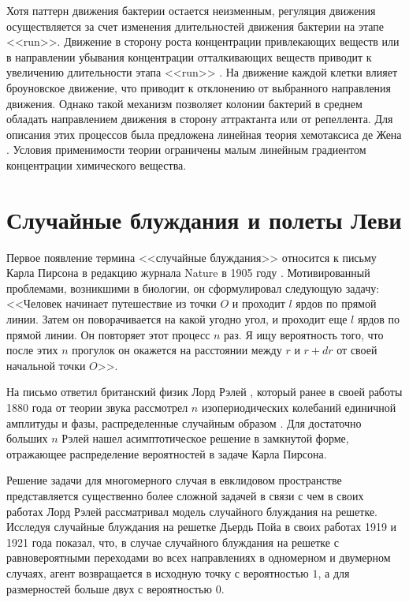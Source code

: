 Хотя паттерн движения бактерии остается неизменным, регуляция движения осуществляется за счет изменения длительностей движения бактерии на этапе <<run>>. Движение в сторону роста концентрации привлекающих веществ или в направлении убывания концентрации отталкивающих веществ приводит к увеличению длительности этапа <<run>> \cite{berg_chemotaxis_1972}. На движение каждой клетки влияет броуновское движение, что приводит к отклонению от выбранного направления движения. Однако такой механизм позволяет колонии бактерий в среднем обладать направлением движения в сторону аттрактанта или от репеллента. Для описания этих процессов была предложена линейная теория хемотаксиса де Жена \cite{de_gennes_chemotaxis_2004}. Условия применимости теории ограничены малым линейным градиентом концентрации химического вещества.

\section{Случайные блуждания и полеты Леви}\label{sec:ch1/sec2}

Первое появление термина <<случайные блуждания>> относится к письму Карла Пирсона в редакцию журнала Nature в 1905 году \cite{pearson_problem_1905}. Мотивированный проблемами, возникшими в биологии, он сформулировал следующую задачу: <<Человек начинает путешествие из точки $O$ и проходит $l$ ярдов по прямой линии. Затем он поворачивается на какой угодно угол, и проходит еще $l$ ярдов по прямой линии. Он повторяет этот процесс $n$ раз. Я ищу вероятность того, что после этих $n$ прогулок он окажется на расстоянии между $r$ и $r+dr$ от своей начальной точки $O$>>.

На письмо ответил британский физик Лорд Рэлей \cite{rayleigh_problem_1905}, который ранее в своей работы 1880 года от теории звука рассмотрел $n$ изопериодических колебаний единичной амплитуды и фазы, распределенные случайным образом \cite{rayleigh_lxi_1877}. Для достаточно больших $n$ Рэлей нашел асимптотическое решение в замкнутой форме, отражающее распределение вероятностей в задаче Карла Пирсона. 

Решение задачи для многомерного случая в евклидовом пространстве представляется существенно более сложной задачей в связи с чем в своих работах Лорд Рэлей рассматривал модель случайного блуждания на решетке. Исследуя случайные блуждания на решетке Дьердь Пойа в своих работах 1919 и 1921 года \cite{polya_uber_1921} показал, что, в случае случайного блуждания на решетке с равновероятными переходами во всех направлениях в одномерном и двумерном случаях, агент возвращается в исходную точку с вероятностью $1$, а для размерностей больше двух с вероятностью $0$.

